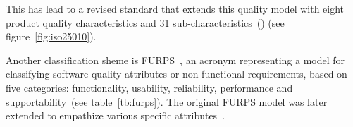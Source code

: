 \documentclass[dissertation,final]{softeng}
\begin{document}
This has lead to a revised standard that extends this quality model with eight product quality characteristics and 31 sub-characteristics~() (see figure~\ref{fig:iso25010}).

Another classification sheme is FURPS~\citep{Grady1987}, an acronym representing a model for classifying software quality attributes or non-functional requirements, based on five categories: functionality, usability, reliability, performance and supportability~(see table~\ref{tb:furps}). The original FURPS model was later extended to empathize various specific attributes~\citep{adams2015non}.

\begin{table}[h!]
\caption[FURPS quality model]{FURPS quality model~\citep{Grady1987}}
\label{tb:furps}
\setlength{\extrarowheight}{1.8pt}
\centering
{}
\end{table}
\end{document}

